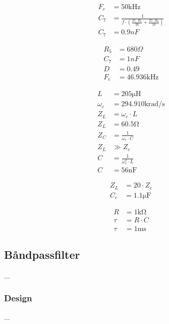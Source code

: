 \begin{align}
F_c & = 50 \si{\kilo \hertz} \\
C_7 & = \frac{1}{f \cdot \left( \frac{25 \cdot R_5 }{36} + \frac{25 \cdot R_6}{18} \right) } \\
C_7 & = 0.9nF \nonumber
\end{align}


\begin{align}
R_5 & = 680 \Omega \nonumber \\
C_7 & = 1nF \nonumber \\
D & = 0.49 \nonumber \\
F_c & = 46.936 \si {\kilo\hertz} \nonumber
\end{align}



\begin{align}
	L & = 205 \si{\micro \henry} \nonumber  \\
	\omega_c & = 294.910 \si{\kilo\radian\per\second} \nonumber \\
	Z_L & = \omega_c \cdot L \\
	Z_L & = 60.5 \si{\ohm} \nonumber \\
	Z_C & = \frac{1}{\omega_c \cdot C} \\
	Z_L & \gg Z_c \nonumber \\
	C & = \frac{1}{\omega_c ^2 \cdot L}	\\
	C & = 56 \si{\nano\farad} \nonumber
	\end{align}


\begin{align}
	Z_L & = 20 \cdot Z_c \\
	C_c & = 1.1 \si{\micro\farad} \nonumber
	\end{align}

\begin{align}
	R & = 1 \si{\kilo\ohm} \nonumber \\
	\tau & = R \cdot C \\
	\tau & = 1 \si{\milli\second} \nonumber
\end{align}

\subsection{Båndpassfilter}
...

\subsubsection{Design}
...

